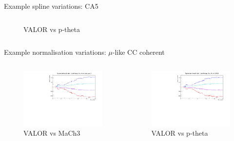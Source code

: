 \documentclass{beamer}
\begin{document}
\begin{frame}{Example spline variations: CA5}
\begin{columns}
\begin{column}{0.5\paperwidth}
\begin{figure}
				\caption*{VALOR vs p-theta}
			\end{figure}
		\end{column}
	\end{columns}
\end{frame}

\begin{frame}{Example normalisation variations: $\mu$-like CC coherent}
	\centering
	\begin{columns}
		\begin{column}{0.5\paperwidth}
			\begin{figure}
				\includegraphics[page=17, trim={0cm 0cm 0cm 0cm}, clip, scale=0.35] {images/variations/valor_mach3/variations_prebanff_unosc_1Re}
				\caption*{VALOR vs MaCh3}
			\end{figure}
		\end{column}
		\begin{column}{0.5\paperwidth}
			\begin{figure}
				\includegraphics[page=13, trim={0cm 0cm 0cm 0cm}, clip, scale=0.35] {images/variations/valor_ptheta/variations_prebanff_unosc_1Re}
				\caption*{VALOR vs p-theta}
			\end{figure}
		\end{column}
	\end{columns}
\end{frame}
\end{document}
